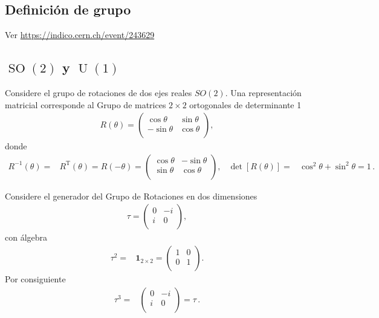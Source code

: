 \subsection{Definición de grupo}
Ver \url{https://indico.cern.ch/event/243629}

\subsection{$\operatorname{SO}(2)$ y $\operatorname{U}(1)$}
Considere el grupo de rotaciones de dos ejes reales $SO(2)$. Una representación matricial corresponde al Grupo de matrices $2\times 2$ ortogonales de determinante 1
\begin{align*}
  R(\theta)=
  \begin{pmatrix}
  \cos\theta &\sin\theta\\  
  -\sin\theta&\cos\theta\\  
  \end{pmatrix},
\end{align*}
donde
\begin{align*}
  R^{-1}(\theta)=& R^{\operatorname{T}}(\theta)=R(-\theta)
=
  \begin{pmatrix}
  \cos\theta &-\sin\theta\\  
  \sin\theta&\cos\theta\\  
  \end{pmatrix}, & \det[R(\theta)]=&\cos^2\theta+\sin^2\theta=1\,.
\end{align*}

Considere el generador del Grupo de Rotaciones en dos dimensiones
\begin{align}
  \label{eq:so2g}
  \tau=
  \begin{pmatrix}
   0 & -i \\
   i & 0 \\    
  \end{pmatrix},
\end{align}
con álgebra
\begin{align}
  \tau^2=&\boldsymbol{1}_{2\times2}=
  \begin{pmatrix}
    1 & 0\\
    0 & 1\\
  \end{pmatrix}. 
\end{align}
Por consiguiente
\begin{align*}
  \tau^3=&  \begin{pmatrix}
    0 & -i\\
    i & 0\\
  \end{pmatrix}=\tau\,.
\end{align*}


